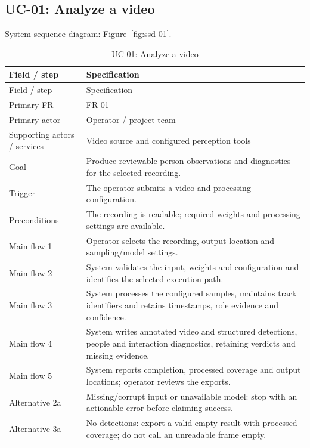 
\subsection*{UC-01: Analyze a video}
\label{uc:01}
System sequence diagram: Figure~\ref{fig:ssd-01}.

\begin{longtable}{P{0.23\textwidth}P{0.67\textwidth}}
\caption{UC-01: Analyze a video}\\
\toprule
Field / step & Specification\\
\midrule
\endfirsthead
\toprule
Field / step & Specification\\
\midrule
\endhead
Primary FR & FR-01\\
Primary actor & Operator / project team\\
Supporting actors / services & Video source and configured perception tools\\
Goal & Produce reviewable person observations and diagnostics for the selected recording.\\
Trigger & The operator submits a video and processing configuration.\\
Preconditions & The recording is readable; required weights and processing settings are available.\\
Main flow 1 & Operator selects the recording, output location and sampling/model settings.\\
Main flow 2 & System validates the input, weights and configuration and identifies the selected execution path.\\
Main flow 3 & System processes the configured samples, maintains track identifiers and retains timestamps, role evidence and confidence.\\
Main flow 4 & System writes annotated video and structured detections, people and interaction diagnostics, retaining verdicts and missing evidence.\\
Main flow 5 & System reports completion, processed coverage and output locations; operator reviews the exports.\\
Alternative 2a & Missing/corrupt input or unavailable model: stop with an actionable error before claiming success.\\
Alternative 3a & No detections: export a valid empty result with processed coverage; do not call an unreadable frame empty.\\

\end{longtable}
